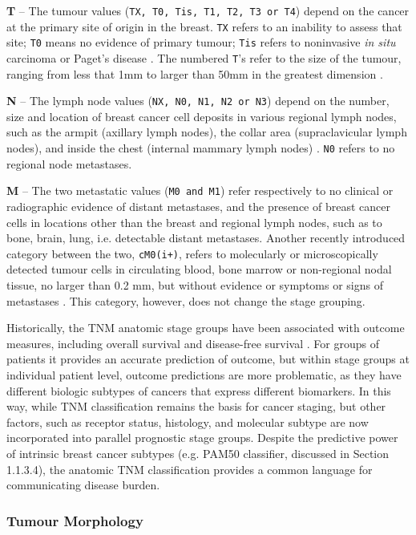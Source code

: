     \textbf{T} – The tumour values (\texttt{TX, T0, Tis, T1, T2, T3 or T4}) depend on the cancer at the primary site of origin in the breast. \texttt{TX} refers to an inability to assess that site; \texttt{T0} means no evidence of primary tumour;  \texttt{Tis} refers to noninvasive \textit{in situ} carcinoma or Paget's disease \cite{Giuliano2017}. The numbered \texttt{T}'s refer to the size of the tumour, ranging from less that 1mm to larger than 50mm in the greatest dimension \cite{2017AJCCStaging}. 

    \textbf{N} – The lymph node values (\texttt{NX, N0, N1, N2 or N3}) depend on the number, size and location of breast cancer cell deposits in various regional lymph nodes, such as the armpit (axillary lymph nodes), the collar area (supraclavicular lymph nodes), and inside the chest (internal mammary lymph nodes) \cite{scatarige1990}. \texttt{N0} refers to no regional node metastases. 
    
    
    \textbf{M} – The two metastatic values (\texttt{M0 and M1}) refer respectively to no clinical or radiographic evidence of distant metastases, and the presence of breast cancer cells in locations other than the breast and regional lymph nodes, such as to bone, brain, lung, i.e. detectable distant metastases. Another recently introduced category between the two, \texttt{cM0(i+)}, refers to molecularly or microscopically detected tumour cells in circulating blood, bone marrow or non-regional nodal tissue, no larger than 0.2 mm, but without evidence or symptoms or signs of metastases \cite{Giuliano2017}. This category, however, does not change the stage grouping. 
    
    
    Historically, the TNM anatomic stage groups have been associated with outcome measures, including overall survival and disease-free survival \cite{Giuliano2017}.  For groups of patients it provides an accurate prediction of outcome, but within stage groups at individual patient level, outcome predictions are more problematic, as they have different biologic subtypes of cancers that express different biomarkers. In this way, while TNM classification remains the basis for cancer staging, but other factors, such as receptor status, histology, and molecular subtype are now incorporated into parallel prognostic stage groups. Despite the predictive power of intrinsic breast cancer subtypes (e.g. PAM50 classifier, discussed in Section 1.1.3.4),  the anatomic TNM classification provides a common language for communicating disease burden.

   \subsubsection{Tumour Morphology}
   
